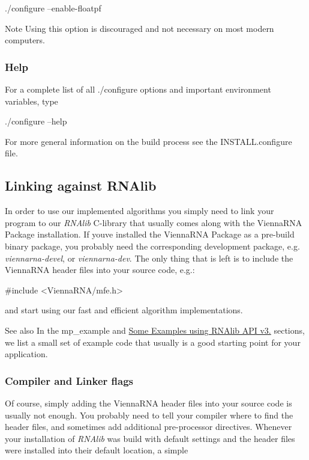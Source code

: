 \begin{DoxyVerb}./configure --enable-floatpf
\end{DoxyVerb}


\begin{DoxyNote}{Note}
Using this option is discouraged and not necessary on most modern computers.
\end{DoxyNote}
\hypertarget{install_config_help}{}\subsubsection{Help}\label{install_config_help}
For a complete list of all ./configure options and important environment variables, type

\begin{DoxyVerb}./configure --help
\end{DoxyVerb}


For more general information on the build process see the I\+N\+S\+T\+A\+L\+L.\+configure file.\hypertarget{install_linking}{}\subsection{Linking against R\+N\+Alib}\label{install_linking}
In order to use our implemented algorithms you simply need to link your program to our {\itshape R\+N\+Alib} C-\/library that usually comes along with the Vienna\+R\+NA Package installation. If you\textquotesingle{}ve installed the Vienna\+R\+NA Package as a pre-\/build binary package, you probably need the corresponding development package, e.\+g. {\itshape viennarna-\/devel}, or {\itshape viennarna-\/dev}. The only thing that is left is to include the Vienna\+R\+NA header files into your source code, e.\+g.\+:

\begin{DoxyVerb}#include <ViennaRNA/mfe.h>
\end{DoxyVerb}


and start using our fast and efficient algorithm implementations.

\begin{DoxySeeAlso}{See also}
In the mp\+\_\+example and \hyperlink{newAPI_newAPI_examples}{Some Examples using R\+N\+Alib A\+PI v3.} sections, we list a small set of example code that usually is a good starting point for your application.
\end{DoxySeeAlso}
\hypertarget{install_linking_flags}{}\subsubsection{Compiler and Linker flags}\label{install_linking_flags}
Of course, simply adding the Vienna\+R\+NA header files into your source code is usually not enough. You probably need to tell your compiler where to find the header files, and sometimes add additional pre-\/processor directives. Whenever your installation of {\itshape R\+N\+Alib} was build with default settings and the header files were installed into their default location, a simple

